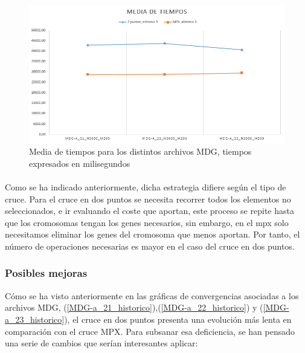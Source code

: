 	\begin{figure}[H]
		\centering
		\includegraphics[scale=0.65]{img/MPXvs2Puntos/Tiempos}
		\caption{Media de tiempos para los distintos archivos MDG, tiempos expresados en milisegundos}
		\label{MDG_MPXvs2Puntos_Tiempos}
		
	\end{figure}
	
	\paragraph{}Como se ha indicado anteriormente, dicha estrategia difiere según el tipo de cruce. Para el cruce en dos puntos se necesita recorrer todos los elementos no seleccionados, e ir evaluando el coste que aportan, este proceso se repite hasta que los cromosomas tengan los genes necesarios, sin embargo, en el mpx solo necesitamos eliminar los genes del cromosoma que menos aportan. Por tanto, el número de operaciones necesarias es mayor en el caso del cruce en dos puntos.
	
	
	\subsubsection{Posibles mejoras}
	
	Cómo se ha visto anteriormente en las gráficas de convergencias asociadas a los archivos MDG, (\ref{MDG-a_21_historico}),(\ref{MDG-a_22_historico}) y (\ref{MDG-a_23_historico}), el cruce en dos puntos presenta una evolución más lenta en comparación con el cruce MPX. Para subsanar esa deficiencia, se han pensado una serie de cambios que serían interesantes aplicar:
	
